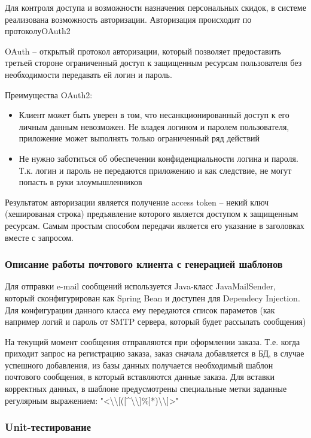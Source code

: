 Для контроля доступа и возможности назначения персональных скидок, в системе реализована возможность авторизации. Авторизация происходит по протоколуOAuth2

OAuth – открытый протокол авторизации, который позволяет предоставить третьей стороне ограниченный доступ к защищенным ресурсам пользователя без необходимости передавать ей логин и пароль.

Преимущества OAuth2:
\begin{itemize}
    \item Клиент может быть уверен в том, что несанкционированный доступ к его личным данным невозможен.
    Не владея логином и паролем пользователя, приложение может выполнять только ограниченный ряд действий
    \item Не нужно заботиться об обеспечении конфиденциальности логина и пароля.
    Т.к. логин и пароль не передаются приложению и как следствие, не могут попасть в руки злоумышленников
\end{itemize}

Результатом авторизации является получение access token – некий ключ (хешированая строка) предъявление которого является доступом к защищенным ресурсам.
Самым простым способом передачи является его указание в заголовках вместе с запросом.

\subsubsection{Описание работы почтового клиента с генерацией шаблонов}\indent

Для отправки e-mail сообщений используется Java-класс JavaMailSender, который сконфигурирован как Spring Bean и доступен для Dependecy Injection.
Для конфигурации данного класса ему передаются список параметов (как например логий и пароль от SMTP сервера, который будет рассылать сообщения)

На текущий момент сообщения отправляются при оформлении заказа.
Т.е. когда приходит запрос на регистрацию заказа, заказ сначала добавляется в БД, в случае успешного добавления, из базы данных получается необходимый шаблон почтового сообщения, в который вставляются данные заказа.
Для вставки корректных данных, в шаблоне предусмотрены специальные метки заданные регулярным выражением: "<\textbackslash\textbackslash[([\textasciicircum\textbackslash\textbackslash]\%]*)\textbackslash\textbackslash]>"

\subsubsection{Unit-тестирование}\indent

